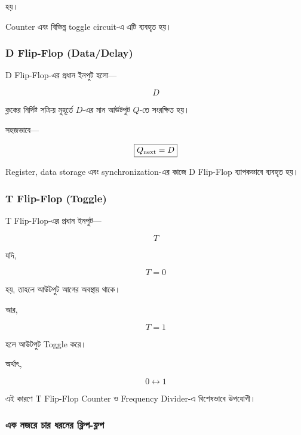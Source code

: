 হয়।

\textenglish{Counter} এবং বিভিন্ন
\textenglish{toggle circuit}-এ এটি ব্যবহৃত হয়।



\subsubsection*{\textenglish{D Flip-Flop (Data/Delay)}}

\textenglish{D Flip-Flop}-এর প্রধান ইনপুট হলো—

\[
D
\]

ক্লকের নির্দিষ্ট সক্রিয় মুহূর্তে \(D\)-এর মান
আউটপুট \(Q\)-তে সংরক্ষিত হয়।

সহজভাবে—

\[
\boxed{
Q_{\text{\textenglish{next}}}=D
}
\]

\textenglish{Register}, \textenglish{data storage} এবং
\textenglish{synchronization}-এর কাজে
\textenglish{D Flip-Flop} ব্যাপকভাবে ব্যবহৃত হয়।



\subsubsection*{\textenglish{T Flip-Flop (Toggle)}}

\textenglish{T Flip-Flop}-এর প্রধান ইনপুট—

\[
T
\]

যদি,

\[
T=0
\]

হয়, তাহলে আউটপুট আগের অবস্থায় থাকে।

আর,

\[
T=1
\]

হলে আউটপুট \textenglish{Toggle} করে।

অর্থাৎ,

\[
0\leftrightarrow1
\]

এই কারণে \textenglish{T Flip-Flop}
\textenglish{Counter} ও
\textenglish{Frequency Divider}-এ বিশেষভাবে উপযোগী।



\subsubsection*{এক নজরে চার ধরনের ফ্লিপ-ফ্লপ}

